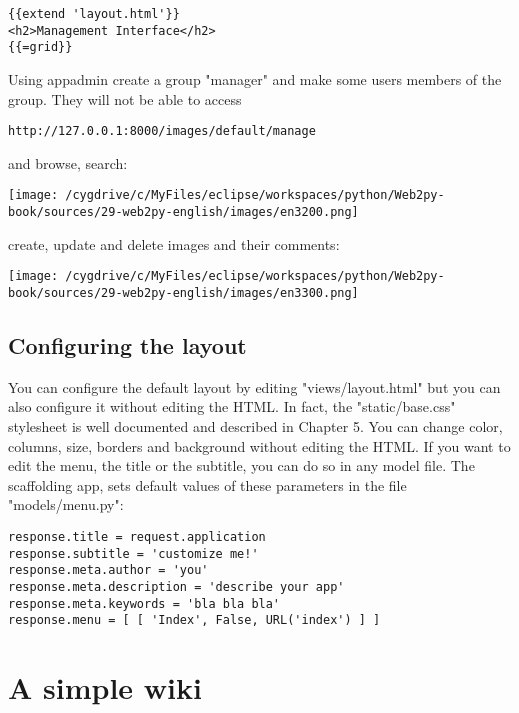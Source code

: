 \documentclass[justified,sixbynine,notoc]{tufte-book}
\begin{document}
\begin{fullwidth}
\begin{lstlisting}[keywords={}]
{{extend 'layout.html'}}
<h2>Management Interface</h2>
{{=grid}}
\end{lstlisting}

Using appadmin create a group "manager" and make some users members of the group. They will not be able to access

\begin{lstlisting}[keywords={}]
http://127.0.0.1:8000/images/default/manage
\end{lstlisting}
\noindent and browse, search:


\goodbreak\begin{center}\texttt{[image: /cygdrive/c/MyFiles/eclipse/workspaces/python/Web2py-book/sources/29-web2py-english/images/en3200.png]}\end{center}

\noindent create, update and delete images and their comments:


\goodbreak\begin{center}\texttt{[image: /cygdrive/c/MyFiles/eclipse/workspaces/python/Web2py-book/sources/29-web2py-english/images/en3300.png]}\end{center}


\goodbreak\subsection{Configuring the layout}

You can configure the default layout by editing "views/layout.html" but you can also configure it without editing the HTML. In fact, the "static/base.css" stylesheet is well documented and described in Chapter 5. You can change color, columns, size, borders and background without editing the HTML. If you want to edit the menu, the title or the subtitle, you can do so in any model file. The scaffolding app, sets default values of these parameters in the file "models/menu.py":

\begin{lstlisting}
response.title = request.application
response.subtitle = 'customize me!'
response.meta.author = 'you'
response.meta.description = 'describe your app'
response.meta.keywords = 'bla bla bla'
response.menu = [ [ 'Index', False, URL('index') ] ]
\end{lstlisting}

\goodbreak\section{A simple wiki}


\end{fullwidth}
\end{document}
